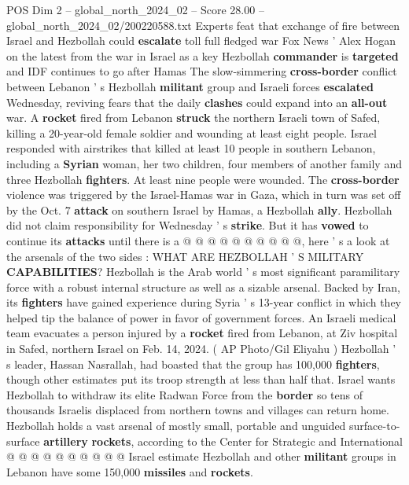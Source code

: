 \begin{textsample}{POS Dim 2 – global\_north\_2024\_02 – Score 28.00 – global\_north\_2024\_02/200220588.txt}  \label{ex:f2_pos_262}
Experts feat that exchange of fire between Israel and Hezbollah could \textbf{escalate} toll full fledged war Fox News ' Alex Hogan on the latest from the war in Israel as a key Hezbollah \textbf{commander} is \textbf{targeted} and IDF continues to go after Hamas The slow-simmering \textbf{cross-border} conflict between Lebanon ' s Hezbollah \textbf{militant} group and Israeli forces \textbf{escalated} Wednesday, reviving fears that the daily \textbf{clashes} could expand into an \textbf{all-out} war.
A \textbf{rocket} fired from Lebanon \textbf{struck} the northern Israeli town of Safed, killing a 20-year-old female soldier and wounding at least eight people.
Israel responded with airstrikes that killed at least 10 people in southern Lebanon, including a \textbf{Syrian} woman, her two children, four members of another family and three Hezbollah \textbf{fighters}.
At least nine people were wounded.
The \textbf{cross-border} violence was triggered by the Israel-Hamas war in Gaza, which in turn was set off by the Oct. 7 \textbf{attack} on southern Israel by Hamas, a Hezbollah \textbf{ally}.
Hezbollah did not claim responsibility for Wednesday ' s \textbf{strike}.
But it has \textbf{vowed} to continue its \textbf{attacks} until there is a @ @ @ @ @ @ @ @ @ @, here ' s a look at the arsenals of the two sides : WHAT ARE HEZBOLLAH ' S MILITARY \textbf{CAPABILITIES}?
Hezbollah is the Arab world ' s most significant paramilitary force with a robust internal structure as well as a sizable arsenal.
Backed by Iran, its \textbf{fighters} have gained experience during Syria ' s 13-year conflict in which they helped tip the balance of power in favor of government forces.
An Israeli medical team evacuates a person injured by a \textbf{rocket} fired from Lebanon, at Ziv hospital in Safed, northern Israel on Feb. 14, 2024. ( AP Photo/Gil Eliyahu ) Hezbollah ' s leader, Hassan Nasrallah, had boasted that the group has 100,000 \textbf{fighters}, though other estimates put its troop strength at less than half that.
Israel wants Hezbollah to withdraw its elite Radwan Force from the \textbf{border} so tens of thousands Israelis displaced from northern towns and villages can return home.
Hezbollah holds a vast arsenal of mostly small, portable and unguided surface-to-surface \textbf{artillery} \textbf{rockets}, according to the Center for Strategic and International @ @ @ @ @ @ @ @ @ @ Israel estimate Hezbollah and other \textbf{militant} groups in Lebanon have some 150,000 \textbf{missiles} and \textbf{rockets}.

\end{textsample}
